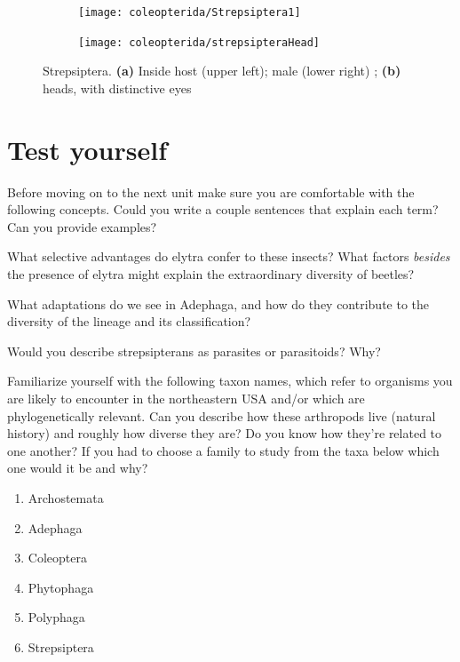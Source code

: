\begin{figure}[ht!]
  \centering
\begin{subfigure}[ht!]{0.5\textwidth}
    \texttt{[image: coleopterida/Strepsiptera1]}
  \caption{}
  \label{fig:strep1}
\end{subfigure}
    \hfill
\begin{subfigure}[ht!]{0.45\textwidth}
    \texttt{[image: coleopterida/strepsipteraHead]}
  \caption{}
  \label{fig:strep2}
\end{subfigure}
    \caption{Strepsiptera. \textbf{(a)} Inside host (upper left); male (lower right) \citep[Plate 45 in][]{bhl91785}; \textbf{(b)} heads, with distinctive eyes \citep[modified from][Plate I, Figs. 4--6]{bhlitem53053stylopidae}}\label{fig:strepsipterans}
\end{figure}

\section*{Test yourself}
Before moving on to the next unit make sure you are comfortable with the following concepts. Could you write a couple sentences that explain each term? Can you provide examples?\vspace{3mm}

\noindent{}What selective advantages do elytra confer to these insects? What factors \textit{besides} the presence of elytra might explain the extraordinary diversity of beetles?\vspace{3mm}

\noindent{}What adaptations do we see in Adephaga, and how do they contribute to the diversity of the lineage and its classification?\vspace{3mm}

\noindent{}Would you describe strepsipterans as parasites or parasitoids? Why?\vspace{3mm}

\noindent{}Familiarize yourself with the following taxon names, which refer to organisms you are likely to encounter in the northeastern USA and/or which are phylogenetically relevant. Can you describe how these arthropods live (natural history) and roughly how diverse they are? Do you know how they're related to one another? If you had to choose a family to study from the taxa below which one would it be and why?
\begin{enumerate} 
\item Archostemata
\item Adephaga
\item Coleoptera  
\item Phytophaga
\item Polyphaga
\item Strepsiptera
\end{enumerate}

\clearpage
\thispagestyle{empty}